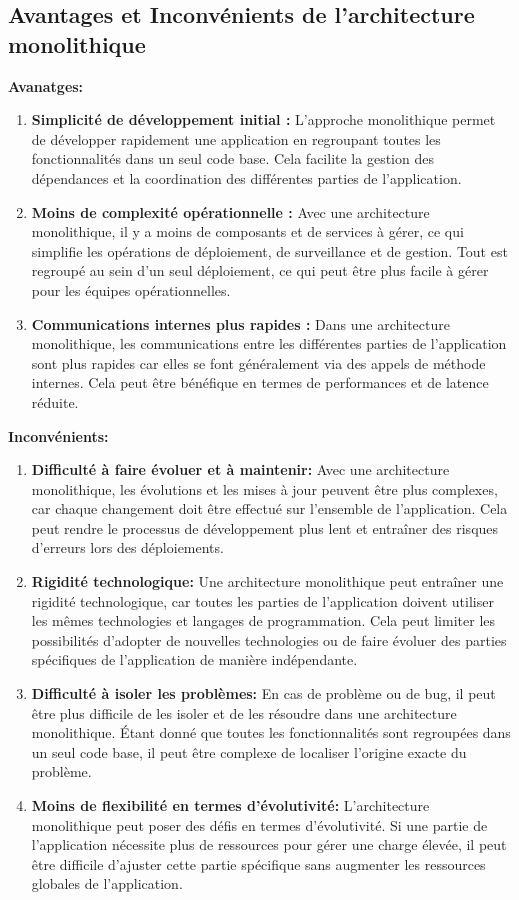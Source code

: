 \subsection{Avantages et Inconvénients de l'architecture monolithique}
\textbf{Avanatges:}
\begin{enumerate}
    \item \textbf{Simplicité de développement initial :} L'approche monolithique permet de développer rapidement une application en regroupant toutes les fonctionnalités dans un seul code base. Cela facilite la gestion des dépendances et la coordination des différentes parties de l'application.
    \item \textbf{Moins de complexité opérationnelle :} Avec une architecture monolithique, il y a moins de composants et de services à gérer, ce qui simplifie les opérations de déploiement, de surveillance et de gestion. Tout est regroupé au sein d'un seul déploiement, ce qui peut être plus facile à gérer pour les équipes opérationnelles.
    \item \textbf{Communications internes plus rapides :} Dans une architecture monolithique, les communications entre les différentes parties de l'application sont plus rapides car elles se font généralement via des appels de méthode internes. Cela peut être bénéfique en termes de performances et de latence réduite.
\end{enumerate}

\textbf{Inconvénients:}
\begin{enumerate}
    \item \textbf{Difficulté à faire évoluer et à maintenir:} Avec une architecture monolithique, les évolutions et les mises à jour peuvent être plus complexes, car chaque changement doit être effectué sur l'ensemble de l'application. Cela peut rendre le processus de développement plus lent et entraîner des risques d'erreurs lors des déploiements.
    \item \textbf{Rigidité technologique:} Une architecture monolithique peut entraîner une rigidité technologique, car toutes les parties de l'application doivent utiliser les mêmes technologies et langages de programmation. Cela peut limiter les possibilités d'adopter de nouvelles technologies ou de faire évoluer des parties spécifiques de l'application de manière indépendante.
    \item \textbf{Difficulté à isoler les problèmes:} En cas de problème ou de bug, il peut être plus difficile de les isoler et de les résoudre dans une architecture monolithique. Étant donné que toutes les fonctionnalités sont regroupées dans un seul code base, il peut être complexe de localiser l'origine exacte du problème.
    \item \textbf{Moins de flexibilité en termes d'évolutivité:} L'architecture monolithique peut poser des défis en termes d'évolutivité. Si une partie de l'application nécessite plus de ressources pour gérer une charge élevée, il peut être difficile d'ajuster cette partie spécifique sans augmenter les ressources globales de l'application.
\end{enumerate}

